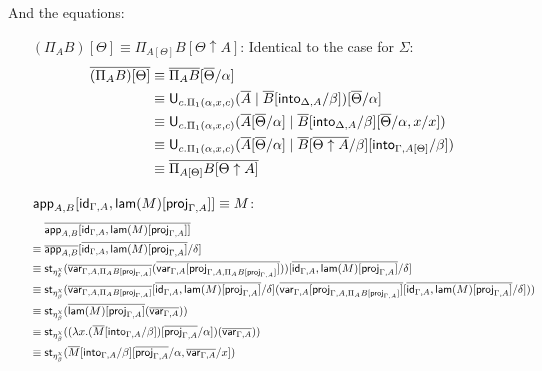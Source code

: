 \documentclass[10pt]{article}
\theoremstyle{definition}
\newcommand{\id}{\mathsf{id}}
\newcommand\U[3]{\ensuremath{\mathsf{U}_{#1}(#2 \mid #3)}}
\newcommand\UI[2]{\ensuremath{\lambda #1.#2}}
\newcommand\StI[2]{\ensuremath{\mathsf{st}_{#1}(#2)}}
\begin{document}
And the equations:
\begin{enumerate}[style = multiline, labelwidth = 80pt]
\item[{$(\Pi_A B)[\Theta] \equiv \Pi_{A[\Theta]} B[\Theta \uparrow A]$}:] Identical to the case for $\Sigma$:
\begin{align*}
\upstairs{(\Pi_A B)[\Theta]}
&\equiv \upstairs{\Pi_A B}[\upstairs{\Theta}/\alpha] \\
&\equiv \U{c.\Pi_1(\alpha,x,c)}{\upstairs{A}}{\upstairs{B}[\into{\Delta, A}/\beta]}[\upstairs{\Theta}/\alpha] \\
&\equiv \U{c.\Pi_1(\alpha,x,c)}{\upstairs{A}[\upstairs{\Theta}/\alpha]}{\upstairs{B}[\into{\Delta, A}/\beta][\upstairs{\Theta}/\alpha,x/x]} \\
&\equiv \U{c.\Pi_1(\alpha,x,c)}{\upstairs{A}[\upstairs{\Theta}/\alpha]}{\upstairs{B}[\upstairs{\Theta \uparrow A}/\beta][\into{\Gamma, A[\Theta]}/\beta]} \\
&\equiv \upstairs{\Pi_{A[\Theta]} B[\Theta \uparrow A]}
\end{align*}
\item[{$\qapp{A,B}[\id_{\Gamma, A}, \qlam(M)[\proj{\Gamma, A}]] \equiv M$}:] 
\begin{align*}
&\upstairs{\qapp{A,B}[\id_{\Gamma, A}, \qlam(M)[\proj{\Gamma, A}]]} \\
\equiv{} &\upstairs{\qapp{A,B}}[\upstairs{\id_{\Gamma, A}, \qlam(M)[\proj{\Gamma, A}]}/\delta] \\
\equiv{} &\StI{\eta^\chi_\delta}{\upstairs{\var{\Gamma, A, \Pi_A B[\proj{\Gamma, A}]}}(\upstairs{\var{\Gamma, A}[\proj{\Gamma, A, \Pi_A B[\proj{\Gamma, A}]}]})}[\upstairs{\id_{\Gamma, A}, \qlam(M)[\proj{\Gamma, A}]}/\delta] \\
\equiv{} &\StI{\eta^\chi_\beta}{\upstairs{\var{\Gamma, A, \Pi_A B[\proj{\Gamma, A}]}}[\upstairs{\id_{\Gamma, A}, \qlam(M)[\proj{\Gamma, A}]}/\delta](\upstairs{\var{\Gamma, A}[\proj{\Gamma, A, \Pi_A B[\proj{\Gamma, A}]}]}[\upstairs{\id_{\Gamma, A}, \qlam(M)[\proj{\Gamma, A}]}/\delta])} \\
\equiv{} &\StI{\eta^\chi_\beta}{\upstairs{\qlam(M)[\proj{\Gamma, A}]}(\upstairs{\var{\Gamma, A}})} \\
\equiv{} &\StI{\eta^\chi_\beta}{(\UI{x}{(\upstairs{M}[\into{\Gamma, A}/\beta])}[\upstairs{\proj{\Gamma, A}}/\alpha])(\upstairs{\var{\Gamma, A}})} \\
\equiv{} &\StI{\eta^\chi_\beta}{\upstairs{M}[\into{\Gamma, A}/\beta][\upstairs{\proj{\Gamma, A}}/\alpha, \upstairs{\var{\Gamma, A}}/x]} \\

\end{align*}
\end{enumerate}
\end{document}
